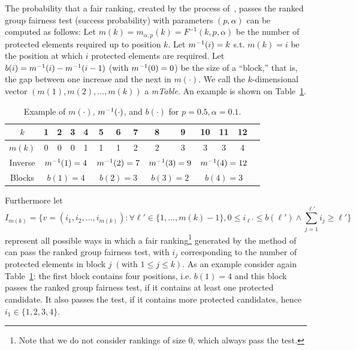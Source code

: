 The probability that a fair ranking, created by the process of~\citet{yang2016measuring}, passes the ranked group fairness test (success probability) with parameters $(p,\alpha)$ can be computed as follows:
%
Let $m(k) = m_{\alpha,p}(k) = F^{-1}(k,p,\alpha)$ be the number of protected elements required up to position $k$.
%
Let $m^{-1}(i) = k$ s.t. $m(k) = i$ be the position at which $i$ protected elements are required.
%
Let $b(i) = m^{-1}(i) - m^{-1}(i-1)$ (with $m^{-1}(0) = 0$) be the size of a ``block,'' that is, the gap between one increase and the next in $m(\cdot)$.
%
We call the $k$-dimensional vector $(m(1), m(2), \ldots , m(k))$ a \emph{mTable}.
%
An example is shown on Table~\ref{tbl:05:example_blocks}.
%
\begin{table}[h]
	\centering
	\begin{tabular}{cccccccccccccc}\toprule
		$k$    & 1 & 2 & 3 & \textbf{{4}} & 5 & 6 & \textbf{7} & 8 & \textbf{9} & 10 & 11 & \textbf{12} \\
		\midrule
		$m(k)$ & 0 & 0 & 0 & \multicolumn{1}{c|}{1} & 1 & 1 & \multicolumn{1}{c|}{2} & 2 & \multicolumn{1}{c|}{3} & 3  & 3  & \multicolumn{1}{c}{4}\\
		Inverse   & \multicolumn{4}{c|}{$m^{-1}(1)=4$}
		& \multicolumn{3}{c|}{$m^{-1}(2)=7$}
		& \multicolumn{2}{c|}{$m^{-1}(3)=9$}
		& \multicolumn{3}{c}{$m^{-1}(4)=12$}\\
		Blocks       & \multicolumn{4}{c|}{$b(1)=4$}
		& \multicolumn{3}{c|}{$b(2)=3$}
		& \multicolumn{2}{c|}{$b(3)=2$}
		& \multicolumn{3}{c}{$b(4)=3$}\\
		\bottomrule
	\end{tabular}
	\caption[Example of different block sizes]{Example of $m(\cdot)$, $m^{-1}(\cdot)$, and $b(\cdot)$ for $p=0.5, \alpha=0.1$.}
	\label{tbl:05:example_blocks}
\end{table}

\noindent Furthermore let
\begin{equation}
	\label{eq:05:combinations}
	I_{m(k)} = \{ v = (i_1, i_2, \ldots, i_{m(k)}): \forall \ell' \in \lbrace 1,\ldots,m(k) -1 \rbrace, 0 \le i_{\ell'} \le b(\ell') \wedge \sum_{j=1}^{\ell'} i_j \ge \ell' \}
\end{equation}
%
represent all possible ways in which a fair ranking\footnote{Note that we do not consider rankings of size 0, which always pass the test.} generated by the method of \citet{yang2016measuring} can pass the ranked group fairness test, with $i_j$ corresponding to the number of protected elements in block $j \; (\text{with } 1 \le j \le k)$.
%
As an example consider again Table~\ref{tbl:05:example_blocks}: the first block contains four positions, i.e. $b(1)=4$ and this block passes the ranked group fairness test, if it contains at least one protected candidate.
%
It also passes the test, if it contains more protected candidates, hence $i_1 \in \{1, 2, 3, 4\}$.

